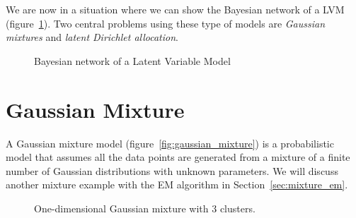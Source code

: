 
We are now in a situation where we can show the Bayesian network of a LVM (figure~\ref{fig:lvm}). Two central problems using these type of models are \emph{Gaussian mixtures} and \emph{latent Dirichlet allocation}.

\begin{figure}[h!]
  \centering
  \caption{Bayesian network of a Latent Variable Model}
  \label{fig:lvm}
\end{figure}


\section{Gaussian Mixture}

A Gaussian mixture model (figure~\ref{fig:gaussian_mixture}) is a probabilistic model that assumes all the data points are generated from a mixture of a finite number of Gaussian distributions with unknown parameters. We will discuss another mixture example with the EM algorithm in Section~\ref{sec:mixture_em}.

\begin{figure}[h!]
  \centering
  \caption{One-dimensional Gaussian mixture with 3 clusters.}
\end{figure}


